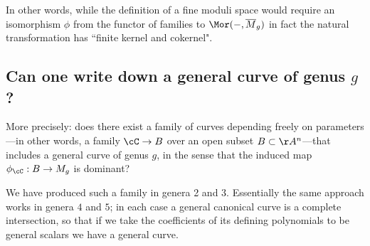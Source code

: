 In other words, while the definition of a fine moduli space would require an isomorphism $\phi$ from the functor of families
to $\Mor(-, \overline M_g)$ in fact the natural transformation has ``finite kernel and cokernel".



%
%


\subsection{Can one write down a general curve of genus $g$?}\label{mgunirational}

More precisely: does there exist  a family of curves depending freely on parameters---in other words, a family $\cC \to B$ over an open subset $B \subset \AA^n$---that includes a general curve of genus $g$, in the sense that the induced map $\phi_\cC : B \to M_g$ is dominant? 	

We have produced such a family in genera 2 and 3. Essentially
the same approach works in genera $4$ and $5$; in each case a general canonical curve is a complete intersection, so that if we take the coefficients of its defining polynomials to be general scalars we have a general curve.

